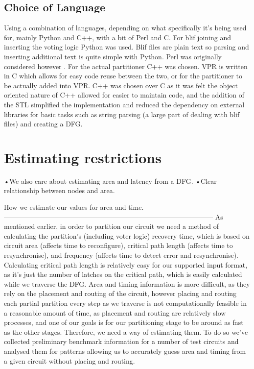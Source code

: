 \documentclass[12pt,draft,a4paper,oneside]{memoir} %
\begin{document}
\subsection{Choice of Language}
Using a combination of languages, depending on what specifically it's being used for, mainly Python and C++, with a bit of Perl and C.
For blif joining and inserting the voting logic Python was used. Blif files are plain text so parsing and inserting additional text is quite simple with Python. Perl was originally considered however . For the actual partitioner C++ was chosen. \ac{VPR} is written in C which allows for easy code reuse between the two, or for the partitioner to be actually added into \ac{VPR}. C++ was chosen over C as it was felt the object oriented nature of C++ allowed for easier to maintain code, and the addition of the \ac{STL} simplified the implementation and reduced the dependency on external libraries for basic tasks such as string parsing (a large part of dealing with blif files) and creating a \ac{DFG}.

\section{Estimating restrictions}
•We also care about estimating area and latency from a DFG.
•Clear relationship between nodes and area.

How we estimate our values for area and time.
--------------------------------------------------------------------------------------------
As mentioned earlier, in order to partition our circuit we need a method of calculating the partition's (including voter logic) recovery time, which is based on circuit area (affects time to reconfigure), critical path length (affects time to resynchronise), and frequency (affects time to detect error and resynchronise). Calculating critical path length is relatively easy for our supported input format, as it's just the number of latches on the critical path, which is easily calculated while we traverse the \ac{DFG}.
Area and timing information is more difficult, as they rely on the placement and routing of the circuit, however placing and routing each partial partition every step as we traverse is not computationally feasible in a reasonable amount of time, as placement and routing are relatively slow processes, and one of our goals is for our partitioning stage to be around as fast as the other stages. Therefore, we need a way of estimating them. To do so we've collected preliminary benchmark information for a number of test circuits and analysed them for patterns allowing us to accurately guess area and timing from a given circuit without placing and routing.
\end{document}
